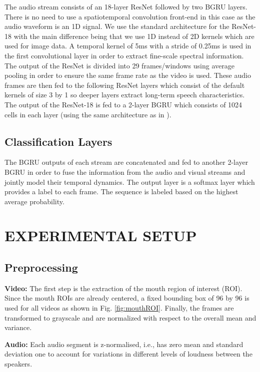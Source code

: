 \documentclass{article}
\begin{document}
The audio stream consists of an 18-layer ResNet followed by two BGRU layers. There is no need to use a spatiotemporal convolution front-end in this case as the audio waveform is an 1D signal. We use the standard architecture for the ResNet-18 with the main difference being that we use 1D  instead of  2D kernels which are used for image data. A temporal kernel of 5ms with a stride of 0.25ms is used in the first convolutional layer in order to extract fine-scale spectral information. The output of the ResNet is divided into 29 frames/windows using average pooling in order to ensure the same frame rate as the video is used. These audio frames are then fed to the following ResNet layers which consist of the default kernels of size 3 by 1 so deeper layers extract long-term speech characteristics. The output of the ResNet-18 is fed to a 2-layer BGRU which consists of 1024 cells in each layer (using the same architecture as in \cite{stafylakis2017combining}).

\subsection{Classification Layers}

The BGRU outputs of each stream are concatenated and fed to another 2-layer BGRU in order to fuse the information from the audio and visual streams and jointly model their temporal dynamics. The output layer is a softmax layer which provides a label to each frame. The sequence is labeled based on the highest average probability. 


\section{EXPERIMENTAL SETUP}

\subsection{Preprocessing}
\textbf{Video:} The first step is the extraction of the mouth region of interest (ROI). Since the mouth ROIs are already centered, a fixed bounding box of 96 by 96 is used for all videos as shown in Fig. \ref{fig:mouthROI}.  Finally, the frames are transformed to grayscale and are normalized with respect to the overall mean and variance.

\noindent
\textbf{Audio:} Each audio segment is z-normalised, i.e., has zero
mean and standard deviation one to account for variations in different
levels of loudness between the speakers.
\end{document}
